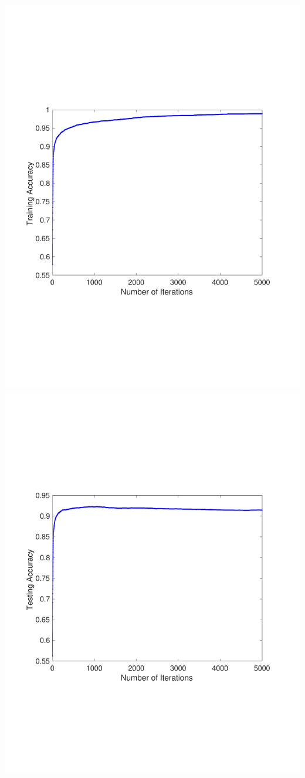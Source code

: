 \documentclass[11pt]{article}
\begin{document}
\begin{enumerate}
\begin{enumerate}
		\includegraphics[scale=.6]{train_err.pdf}\\
		\includegraphics[scale=.6]{test_err.pdf}

\end{enumerate}
\end{enumerate}
\end{document}

